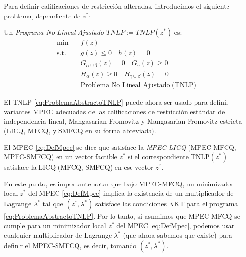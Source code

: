 Para definir calificaciones de restricción alteradas, introducimos el siguiente problema, dependiente de $z^*$:

\begin{definition}

Un \textit{Programa No Lineal Ajustado $TNLP := TNLP(z^*)$} es:
\begin{equation}
\begin{aligned} 
\min \quad & f(z) \\
\text{s.t.} \quad & g(z) \leq 0 \quad h(z) = 0  \\
& G_{\alpha \cup \beta}(z) = 0 \quad G_{\gamma}(z) \geq 0  \\
& H_{\alpha}(z) \geq 0 \quad H_{\gamma \cup \beta}(z) = 0  \\
& \text{Problema No Lineal Ajustado (TNLP)}  
\end{aligned}
\label{eq:ProblemaAbstractoTNLP}
\end{equation}
    
\end{definition}

El TNLP \eqref{eq:ProblemaAbstractoTNLP} puede ahora ser usado para definir variantes MPEC adecuadas de las calificaciones de restricción estándar de independencia lineal, Mangasarian-Fromovitz y Mangasarian-Fromovitz estricta (LICQ, MFCQ, y SMFCQ en su forma abreviada).

\begin{definition}
El MPEC \eqref{eq:DefMpec} se dice que satisface la \textit{MPEC-LICQ} (MPEC-MFCQ, MPEC-SMFCQ) en un vector factible $z^*$ si el correspondiente TNLP$(z^*)$ satisface la LICQ (MFCQ, SMFCQ) en ese vector $z^*$.
\end{definition}
    
En este punto, es importante notar que bajo MPEC-MFCQ, un minimizador local $z^*$ del MPEC \eqref{eq:DefMpec} implica la existencia de un multiplicador de Lagrange $\lambda^*$ tal que $(z^*, \lambda^*)$ satisface las condiciones KKT para el programa \eqref{eq:ProblemaAbstractoTNLP}. Por lo tanto, si asumimos que MPEC-MFCQ se cumple para un minimizador local $z^*$ del MPEC \eqref{eq:DefMpec}, podemos usar cualquier multiplicador de Lagrange $\lambda^*$ (que ahora sabemos que existe) para definir el MPEC-SMFCQ, es decir, tomando $(z^*, \lambda^*)$.

